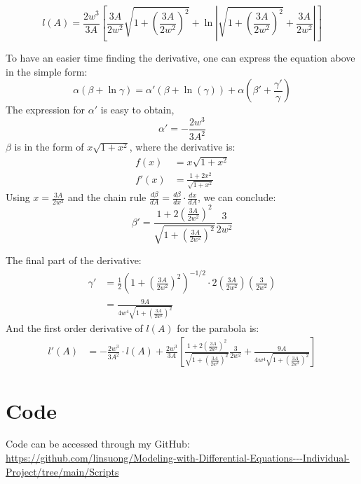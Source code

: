 \documentclass[12pt]{article}
\begin{document}
\begin{equation}
    l(A) = \frac{2w^3}{3A}\left[\frac{3A}{2w^2}\sqrt{1 + \left(\frac{3A}{2w^2}\right)^2}+\ln\left|\sqrt{1 + \left(\frac{3A}{2w^2}\right)^2} + \frac{3A}{2w^2}\right|\right]
\end{equation}

To have an easier time finding the derivative, one can express the equation above in the simple form:
\begin{equation}
    \alpha(\beta + \ln{\gamma}) = \alpha'(\beta + \ln(\gamma)) + \alpha\left(\beta' + \frac{\gamma'}{\gamma}\right)
\end{equation}
The expression for $\alpha'$ is easy to obtain,
\begin{equation}
    \alpha' = -\frac{2w^3}{3A^2}
\end{equation}
$\beta$ is in the form of $x\sqrt{1 + x^2}$, where the derivative is:
\begin{equation}
    \begin{split}
        f(x) &= x\sqrt{1 + x^2}
        \\
        f'(x) &= \frac{1 + 2x^2}{\sqrt{1 + x^2}}
    \end{split}
\end{equation}
Using $x = \frac{3A}{2w^2}$ and the chain rule $\frac{d\beta}{dA} = \frac{d\beta}{dx}\cdot\frac{dx}{dA}$, we can conclude:
\begin{equation}
    \beta' = \frac{1 + 2\left(\frac{3A}{2w^2}\right)^2}{\sqrt{1 + \left(\frac{3A}{2w^2}\right)^2}}\frac{3}{2w^2}
\end{equation}

The final part of the derivative:
\begin{equation}
    \begin{split}
        \gamma' &= \frac{1}{2}\left(1 + \left(\frac{3A}{2w^2}\right)^2\right)^{-1/2}\cdot2\left(\frac{3A}{2w^2}\right)\left(\frac{3}{2w^2}\right)
        \\&=\frac{9A}{4w^4\sqrt{1 + \left(\frac{3A}{2w^2}\right)^2}}
    \end{split}
\end{equation}
And the first order derivative of $l(A)$ for the parabola is:
\begin{equation}
    \begin{split}
        l'(A) &= -\frac{2w^3}{3A^2}\cdot l(A) +  \frac{2w^3}{3A}\left[\frac{1 + 2\left(\frac{3A}{2w^2}\right)^2}{\sqrt{1 + \left(\frac{3A}{2w^2}\right)^2}}\frac{3}{2w^2} +  \frac{9A}{4w^4\sqrt{1 + \left(\frac{3A}{2w^2}\right)^2}}\right]
    \end{split}
\end{equation}

\section{Code}
Code can be accessed through my GitHub: 
\\\url{https://github.com/linsuong/Modeling-with-Differential-Equations---Individual-Project/tree/main/Scripts}
\end{document}
